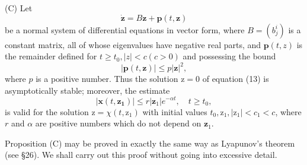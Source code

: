 \documentclass[10pt,a5paper]{book}
\theoremstyle{plain}
\theoremstyle{definition}
\theoremstyle{remark}
\begin{document}
(C) Let
\begin{equation*}
\dot{\mathbf{z}}=B \mathbf{z}+\mathbf{p}(t, \mathbf{z}) \tag{13}
\end{equation*}
be a normal system of differential equations in vector form, where $B=\left(b_{j}^{i}\right)$ is a constant matrix, all of whose eigenvalues have negative real parts, and $\mathbf{p}(t, z)$ is the remainder defined for $t \geq t_{0},|z|<c(c>0)$ and possessing the bound
\begin{equation*}
|\mathbf{p}(t, \mathbf{z})| \leq p|\mathbf{z}|^{2}, \tag{14}
\end{equation*}
where $p$ is a positive number. Thus the solution $\mathrm{z}=0$ of equation (13) is asymptotically stable; moreover, the estimate
\begin{equation*}
\left|\boldsymbol{x}\left(t, \mathbf{z}_{\mathbf{1}}\right)\right| \leq r\left|\mathbf{z}_{1}\right| e^{-\alpha t}, \quad t \geq t_{0}, \tag{15}
\end{equation*}
is valid for the solution $\mathrm{z}=\chi\left(t, \mathrm{z}_{1}\right)$ with initial values $t_{0}, \mathrm{z}_{1},\left|\mathrm{z}_{1}\right|<c_{1}<c$, where $r$ and $\alpha$ are positive numbers which do not depend on $\mathbf{z}_{1}$.

Proposition (C) may be proved in exactly the same way as Lyapunov's theorem (see §26). We shall carry out this proof without going into excessive detail.
\end{document}
